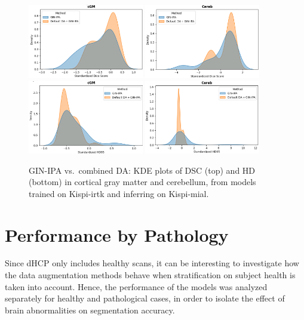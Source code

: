 \begin{figure}[htbp]
  \centering
  \includegraphics[width=0.45\textwidth]{figures/2_irtk-mial_DC_cGM.png}\quad
  \includegraphics[width=0.45\textwidth]{figures/2_irtk-mial_DC_Cereb.png} \\
  \vspace{10pt}
  \includegraphics[width=0.45\textwidth]{figures/2_irtk-mial_HD_cGM.png}\quad
  \includegraphics[width=0.45\textwidth]{figures/2_irtk-mial_HD_Cereb.png}
  \caption{GIN-IPA vs.\ combined DA: KDE plots of DSC (top) and HD (bottom) in cortical gray matter and cerebellum, from models trained on Kispi-irtk and inferring on Kispi-mial.}
  \label{fig:2_irtk_mial}
\end{figure}

\section{Performance by Pathology}
Since dHCP only includes healthy scans, it can be interesting to investigate how the data augmentation methods behave when stratification on subject health is taken into account. Hence, the performance of the models was analyzed separately for healthy and pathological cases, in order to isolate the effect of brain abnormalities on segmentation accuracy.

